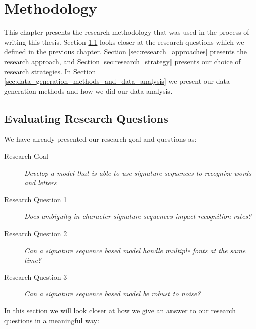 
\chapter{Methodology}
\label{ch:methodology}
This chapter presents the research methodology that was used in the process of writing this thesis. Section \ref{sec:research_questions_and_approach} looks closer at the research questions which we defined in the previous chapter. Section \ref{sec:research_approaches} presents the research approach, and Section \ref{sec:research_strategy} presents our choice of research strategies. In Section \ref{sec:data_generation_methods_and_data_analysis} we present our data generation methods and how we did our data analysis.


\section{Evaluating Research Questions}
\label{sec:research_questions_and_approach}
We have already presented our research goal and questions as:

\begin{description}
    \item[Research Goal]{\textit{Develop a model that is able to use signature sequences to recognize words and letters}}
    \item[Research Question 1]{\textit{Does ambiguity in character signature sequences impact recognition rates?}}
    \item[Research Question 2]{\textit{Can a signature sequence based model handle multiple fonts at the same time?}}
    \item[Research Question 3]{\textit{Can a signature sequence based model be robust to noise?}}
\end{description}

\newpage
In this section we will look closer at how we give an answer to our research questions in a meaningful way:

